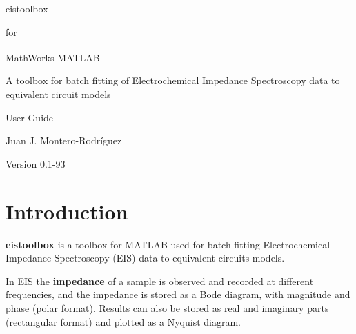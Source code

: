 \documentclass[10pt,a4paper,oneside]{book}
\begin{document}
\setlength{\parindent}{0pt}
\setlength{\parskip}{6pt}

 \vspace*{3cm}
	
 \begin{center}
 	\Huge eistoolbox \par
 \end{center}
 \begin{center}
 	\LARGE for \par
 \end{center}
 \begin{center}
 	\Huge MathWorks\textsuperscript{\textregistered} MATLAB \par
 \end{center}
 
 \vspace*{2cm}
 
\begin{center}
	\Large A toolbox for batch fitting of Electrochemical Impedance Spectroscopy data to equivalent circuit models
\end{center} 
 
 \vspace*{2cm}
 
 \begin{center}
 	\Huge User Guide \par
 \end{center}
 \begin{center}
 	\LARGE Juan J. Montero-Rodríguez \par
 \end{center}
 
 \vspace*{4cm}
 
 \begin{center}
 	\Large Version 0.1-93
 \end{center}

\clearpage

\tableofcontents

\chapter{Introduction}

\textbf{eistoolbox} is a toolbox for MATLAB\textregistered{} used for batch fitting Electrochemical Impedance Spectroscopy (EIS) data to equivalent circuits models.

In EIS the \textbf{impedance} of a sample is observed and recorded at different frequencies, and the impedance is stored as a Bode diagram, with magnitude and phase (polar format). Results can also be stored as real and imaginary parts (rectangular format) and plotted as a Nyquist diagram.
\end{document}
